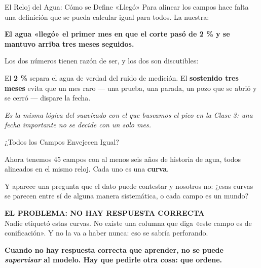 \documentclass[aspectratio=169, 11pt]{beamer}
\begin{document}
\begin{frame}[shrink=8]{El Reloj del Agua: Cómo se Define «Llegó»}
  \vspace{4pt}
  {\footnotesize\color{textMuted}
   Para alinear los campos hace falta una definición que se pueda calcular
   igual para todos. La nuestra:}
  \vspace{7pt}
  \begin{tcolorbox}[colback=arcaGray, colframe=arcaDark, boxrule=0pt,
    leftrule=4pt, arc=3pt, left=10pt, right=10pt, top=7pt, bottom=7pt]
    {\footnotesize\color{arcaDark}\bfseries
     El agua «llegó» el primer mes en que el corte pasó de \textbf{2 \%} y se
     mantuvo arriba \textbf{tres meses seguidos}.}
  \end{tcolorbox}
  \vspace{8pt}
  {\footnotesize\color{textMuted}
   Los dos números tienen razón de ser, y los dos son discutibles:
   \vspace{6pt}

   El \textbf{2 \%} separa el agua de verdad del ruido de medición. El
   \textbf{sostenido tres meses} evita que un mes raro --- una prueba, una
   parada, un pozo que se abrió y se cerró --- dispare la fecha.}
  \vspace{8pt}
  {\footnotesize\color{arcaDark}\itshape
   Es la misma lógica del suavizado con el que buscamos el pico en la Clase 3:
   una fecha importante no se decide con un solo mes.}
\end{frame}

\begin{frame}[shrink=8]{¿Todos los Campos Envejecen Igual?}
  \vspace{4pt}
  {\footnotesize\color{textMuted}
   Ahora tenemos 45 campos con al menos seis años de historia de agua, todos
   alineados en el mismo reloj. Cada uno es una \textbf{curva}.
   \vspace{7pt}

   Y aparece una pregunta que el dato puede contestar y nosotros no:
   ¿esas curvas se parecen entre sí de alguna manera sistemática, o cada campo
   es un mundo?}
  \vspace{8pt}
  \begin{tcolorbox}[colback=arcaGray, colframe=arcaRed, boxrule=0pt,
    leftrule=3pt, arc=3pt, left=9pt, right=9pt, top=6pt, bottom=6pt]
    {\scriptsize\color{arcaRed}\bfseries EL PROBLEMA: NO HAY RESPUESTA CORRECTA}\\[4pt]
    {\footnotesize\color{textMuted}
     Nadie etiquetó estas curvas. No existe una columna que diga «este campo
     es de conificación». Y no la va a haber nunca: eso se sabría perforando.}
  \end{tcolorbox}
  \vspace{8pt}
  {\footnotesize\color{arcaDark}\bfseries
   Cuando no hay respuesta correcta que aprender, no se puede
   \emph{supervisar} al modelo. Hay que pedirle otra cosa: que
   \textbf{ordene}.}
\end{frame}
\end{document}
